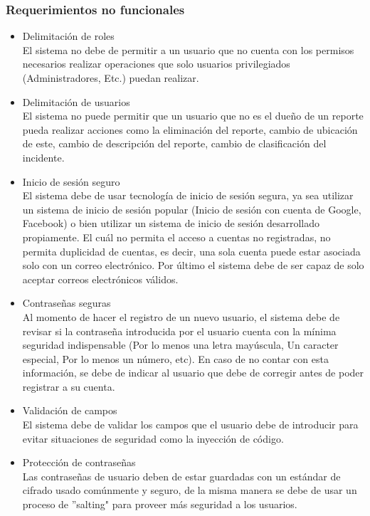 \subsubsection{Requerimientos no funcionales}
\begin{itemize}
    \item Delimitación de roles\\
    El sistema no debe de permitir a un usuario que no cuenta con los permisos necesarios realizar operaciones que solo usuarios privilegiados (Administradores, Etc.) puedan realizar.
    \item Delimitación de usuarios\\
    El sistema no puede permitir que un usuario que no es el dueño de un reporte pueda realizar acciones como la eliminación del reporte, cambio de ubicación de este, cambio de descripción del reporte, cambio de clasificación del incidente.
    \item Inicio de sesión seguro\\
    El sistema debe de usar tecnología de inicio de sesión segura, ya sea utilizar un sistema de inicio de sesión popular (Inicio de sesión con cuenta de Google, Facebook) o bien utilizar un sistema de inicio de sesión desarrollado propiamente. El cuál no permita el acceso a cuentas no registradas, no permita duplicidad de cuentas, es decir, una sola cuenta puede estar asociada solo con un correo electrónico. Por último el sistema debe de ser capaz de solo aceptar correos electrónicos válidos.
    \item Contraseñas seguras\\
    Al momento de hacer el registro de un nuevo usuario, el sistema debe de revisar si la contraseña introducida por el usuario cuenta con la mínima seguridad indispensable (Por lo menos una letra mayúscula, Un caracter especial, Por lo menos un número, etc). En caso de no contar con esta información, se debe de indicar al usuario que debe de corregir antes de poder registrar a su cuenta.
    \item Validación de campos\\
    El sistema debe de validar los campos que el usuario debe de introducir para evitar situaciones de seguridad como la inyección de código.
    \item Protección de contraseñas\\
    Las contraseñas de usuario deben de estar guardadas con un estándar de cifrado usado comúnmente y seguro, de la misma manera se debe de usar un proceso de ''salting" para proveer más seguridad a los usuarios.
\end{itemize}

